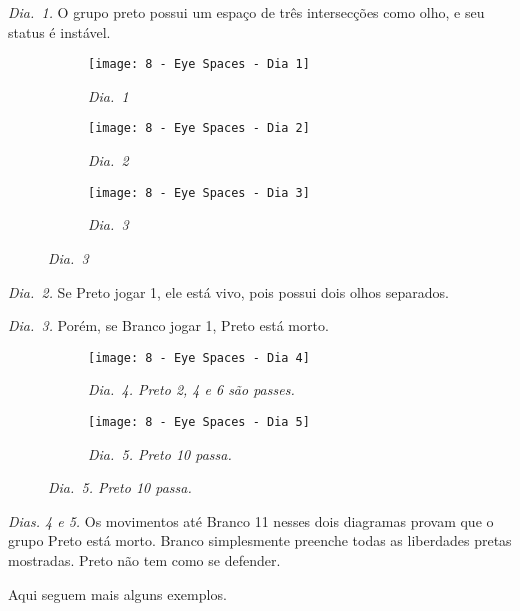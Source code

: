 \emph{Dia.\@~1.} O grupo preto possui um espaço de três intersecções como olho, e seu status é instável.

\begin{figure}[h!]
    \centering
    \begin{subfigure}[t]{.31\textwidth}
        \texttt{[image: 8 - Eye Spaces - Dia 1]}
        \captionsetup{justification=centering}
        \caption*{\emph{Dia.\@~1}}
    \end{subfigure}
    \hfill
    \begin{subfigure}[t]{.31\textwidth}
        \texttt{[image: 8 - Eye Spaces - Dia 2]}
        \captionsetup{justification=centering}
        \caption*{\emph{Dia.\@~2}}
    \end{subfigure}
    \hfill
    \begin{subfigure}[t]{.31\textwidth}
        \texttt{[image: 8 - Eye Spaces - Dia 3]}
        \captionsetup{justification=centering}
        \caption*{\emph{Dia.\@~3}}
    \end{subfigure}
\end{figure}

\emph{Dia.\@~2.} Se Preto jogar 1, ele está vivo, pois possui dois olhos separados.

\emph{Dia.\@~3.} Porém, se Branco jogar 1, Preto está morto.

\begin{figure}[h!]
    \centering
    \begin{subfigure}[t]{.31\textwidth}
        \texttt{[image: 8 - Eye Spaces - Dia 4]}
        \caption*{\emph{Dia.\@~4. Preto 2, 4 e 6 são passes.}}
    \end{subfigure}
    \hspace{1cm}
    \begin{subfigure}[t]{.31\textwidth}
        \texttt{[image: 8 - Eye Spaces - Dia 5]}
        \captionsetup{justification=centering}
        \caption*{\emph{Dia.\@~5. Preto 10 passa.}}
    \end{subfigure}
\end{figure}

\emph{Dias. 4 e 5.} Os movimentos até Branco 11 nesses dois diagramas provam que o grupo Preto está morto. Branco simplesmente preenche todas as liberdades pretas mostradas. Preto não tem como se defender.

Aqui seguem mais alguns exemplos.

